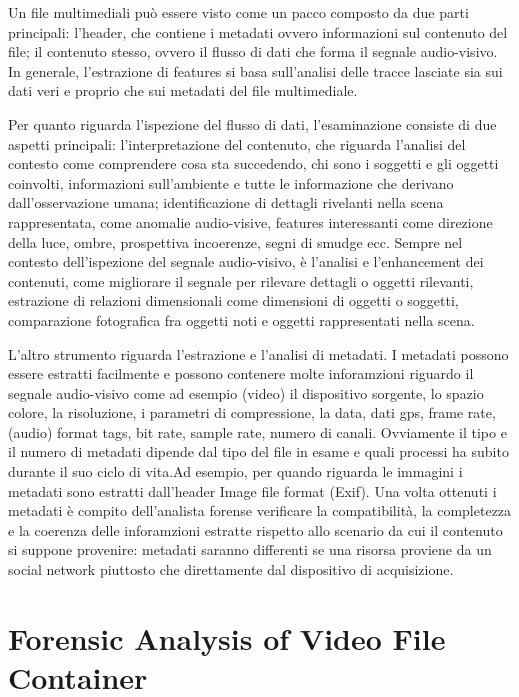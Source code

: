 Un file multimediali può essere visto come un pacco composto da due parti principali: l'header, che contiene i metadati ovvero informazioni sul contenuto del file; il contenuto stesso, ovvero il flusso di dati che forma il segnale audio-visivo.
In generale, l'estrazione di features si basa sull'analisi delle tracce lasciate sia sui dati veri e proprio che sui metadati del file multimediale.

Per quanto riguarda l'ispezione del flusso di dati, l'esaminazione consiste di due aspetti principali: l'interpretazione del contenuto, che riguarda l'analisi del contesto come comprendere cosa sta succedendo, chi sono i soggetti e gli oggetti coinvolti, informazioni sull'ambiente e tutte le informazione che derivano dall'osservazione umana; identificazione di dettagli rivelanti nella scena rappresentata, come anomalie audio-visive, features interessanti come direzione della luce, ombre, prospettiva incoerenze, segni di smudge ecc. Sempre nel contesto dell'ispezione del segnale audio-visivo, è l'analisi e l'enhancement dei contenuti, come migliorare il segnale per rilevare dettagli o oggetti rilevanti, estrazione di relazioni dimensionali come dimensioni di oggetti o soggetti, comparazione fotografica fra oggetti noti e oggetti rappresentati nella scena.

L'altro strumento riguarda l'estrazione e l'analisi di metadati. I metadati possono essere estratti facilmente e possono contenere molte inforamzioni riguardo il segnale audio-visivo come ad esempio (video) il dispositivo sorgente, lo spazio colore, la risoluzione, i parametri di compressione, la data, dati gps, frame rate, (audio) format tags, bit rate, sample rate, numero di canali. Ovviamente il tipo e il numero di metadati dipende dal tipo del file in esame e quali processi ha subito durante il suo ciclo di vita.Ad esempio, per quando riguarda le immagini i metadati sono estratti dall'header Image file format (Exif). Una volta ottenuti i metadati è compito dell'analista forense verificare la compatibilità, la completezza e la coerenza delle inforamzioni estratte rispetto allo scenario da cui il contenuto si suppone provenire: metadati saranno differenti se una risorsa proviene da un social network piuttosto che direttamente dal dispositivo di acquisizione.



\section{Forensic Analysis of Video File Container}

